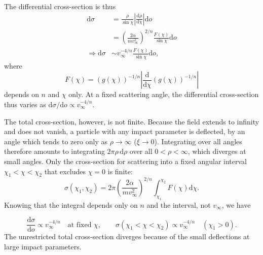 \begin{problem}[title={Power-law fields: cross-section vs. velocity}]
{The differential cross-section is thus
\begin{align*}
    \mathrm{d}\sigma &= \frac{\rho}{\sin{\chi}} \left| \frac{\mathrm{d}\rho}{\mathrm{d}\chi} \right| \mathrm{d}o \\
    &= \left( \frac{2\alpha}{mv_\infty^2} \right)^{2/n} \frac{F(\chi)}{\sin{\chi}} \mathrm{d}o \\
    \Rightarrow \mathrm{d}\sigma &\sim v_\infty^{-4/n} \frac{F(\chi)}{\sin{\chi}} \mathrm{d}o,
\end{align*}
where
\begin{equation*}
    F(\chi) = \left( g(\chi) \right)^{-1/n} \left| \frac{\mathrm{d}}{\mathrm{d}\chi} \left( g(\chi) \right)^{-1/n} \right|
\end{equation*}
depends on $n$ and $\chi$ only. At a fixed scattering angle, the differential cross-section thus varies as $\mathrm{d}\sigma/\mathrm{d}o \propto v_\infty^{-4/n}$.

The total cross-section, however, is not finite. Because the field extends to infinity and does not vanish, a particle with any impact parameter is deflected, by an angle which tends to zero only as $\rho \rightarrow \infty$ ($\xi \rightarrow 0$). Integrating over all angles therefore amounts to integrating $2\pi\rho\,\mathrm{d}\rho$ over all $0<\rho<\infty$, which diverges at small angles. Only the cross-section for scattering into a fixed angular interval $\chi_1 < \chi < \chi_2$ that excludes $\chi = 0$ is finite:
\begin{equation*}
    \sigma(\chi_1,\chi_2) = 2\pi\left( \frac{2\alpha}{mv_\infty^2} \right)^{2/n} \int_{\chi_1}^{\chi_2} F(\chi) \mathrm{d}\chi.
\end{equation*}
Knowing that the integral depends only on $n$ and the interval, not $v_\infty$, we have
}
{
\begin{equation*}
    \frac{\mathrm{d}\sigma}{\mathrm{d}o} \propto v_\infty^{-4/n} \quad \text{at fixed } \chi,
    \qquad
    \sigma(\chi_1<\chi<\chi_2) \propto v_\infty^{-4/n} \quad (\chi_1>0).
\end{equation*}
The unrestricted total cross-section diverges because of the small deflections at large impact parameters.
}
\end{problem}


